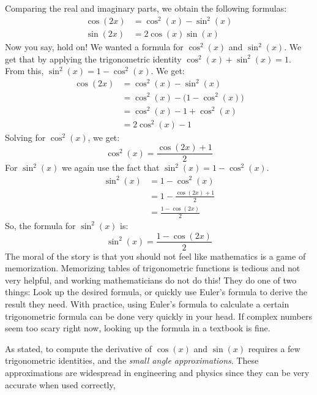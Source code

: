 \documentclass{article}
\begin{document}
    Comparing the real and imaginary parts, we obtain the following formulas:
    \begin{align}
        \cos(2x)&=\cos^{2}(x)-\sin^{2}(x)\\
        \sin(2x)&=2\cos(x)\sin(x)
    \end{align}
    Now you say, hold on! We wanted a formula for $\cos^{2}(x)$ and
    $\sin^{2}(x)$. We get that by applying the trigonometric identity
    $\cos^{2}(x)+\sin^{2}(x)=1$. From this, $\sin^{2}(x)=1-\cos^{2}(x)$. We get:
    \begin{align}
        \cos(2x)&=\cos^{2}(x)-\sin^{2}(x)\\
            &=\cos^{2}(x)-\big(1-\cos^{2}(x)\big)\\
            &=\cos^{2}(x)-1+\cos^{2}(x)\\
            &=2\cos^{2}(x)-1
    \end{align}
    Solving for $\cos^{2}(x)$, we get:
    \begin{equation}
        \cos^{2}(x)=\frac{\cos(2x)+1}{2}
    \end{equation}
    For $\sin^{2}(x)$ we again use the fact that $\sin^{2}(x)=1-\cos^{2}(x)$.
    \begin{align}
        \sin^{2}(x)&=1-\cos^{2}(x)\\
            &=1-\frac{\cos(2x)+1}{2}\\
            &=\frac{1-\cos(2x)}{2}
    \end{align}
    So, the formula for $\sin^{2}(x)$ is:
    \begin{equation}
        \sin^{2}(x)=\frac{1-\cos(2x)}{2}
    \end{equation}
    The moral of the story is that you should not feel like mathematics is a
    game of memorization. Memorizing tables of trigonometric functions is
    tedious and not very helpful, and working mathematicians do not do this!
    They do one of two things: Look up the desired formula, or quickly use
    Euler's formula to derive the result they need. With practice, using
    Euler's formula to calculate a certain trigonometric formula can be done
    very quickly in your head. If complex numbers seem too scary right now,
    looking up the formula in a textbook is fine.
    \par\hfill\par
    As stated, to compute the derivative of $\cos(x)$ and $\sin(x)$ requires
    a few trigonometric identities, and the
    \textit{small angle approximations}. These approximations are widespread in
    engineering and physics since they can be very accurate when used correctly,
\end{document}
